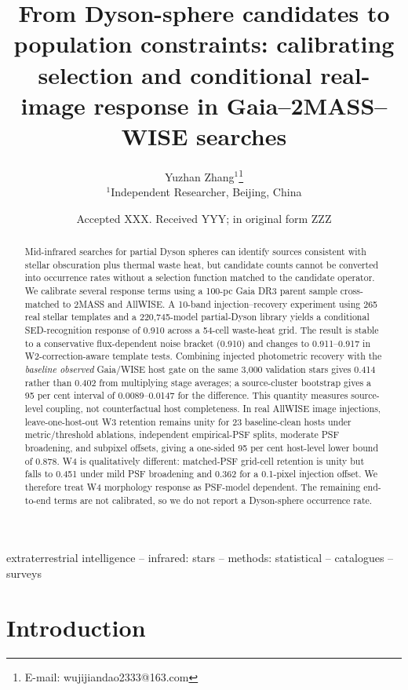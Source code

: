 \documentclass[fleqn,usenatbib]{mnras}
\title[Calibrating Dyson-sphere selection]{From Dyson-sphere candidates to population constraints: calibrating selection and conditional real-image response in Gaia--2MASS--WISE searches}
\author[Zhang]{
Yuzhan Zhang$^{1}$\orcidlink{0009-0000-3121-7972}\thanks{E-mail: wujijiandao2333@163.com}
\\
$^{1}$Independent Researcher, Beijing, China
}
\date{Accepted XXX. Received YYY; in original form ZZZ}
\begin{document}
\label{firstpage}
\pagerange{\pageref{firstpage}--\pageref{lastpage}}
\maketitle

\begin{abstract}
Mid-infrared searches for partial Dyson spheres can identify sources consistent with stellar obscuration plus thermal waste heat, but candidate counts cannot be converted into occurrence rates without a selection function matched to the candidate operator. We calibrate several response terms using a 100-pc Gaia DR3 parent sample cross-matched to 2MASS and AllWISE. A 10-band injection--recovery experiment using 265 real stellar templates and a 220,745-model partial-Dyson library yields a conditional SED-recognition response of 0.910 across a 54-cell waste-heat grid. The result is stable to a conservative flux-dependent noise bracket (0.910) and changes to 0.911--0.917 in W2-correction-aware template tests. Combining injected photometric recovery with the \emph{baseline observed} Gaia/WISE host gate on the same 3,000 validation stars gives 0.414 rather than 0.402 from multiplying stage averages; a source-cluster bootstrap gives a 95 per cent interval of 0.0089--0.0147 for the difference. This quantity measures source-level coupling, not counterfactual host completeness. In real AllWISE image injections, leave-one-host-out W3 retention remains unity for 23 baseline-clean hosts under metric/threshold ablations, independent empirical-PSF splits, moderate PSF broadening, and subpixel offsets, giving a one-sided 95 per cent host-level lower bound of 0.878. W4 is qualitatively different: matched-PSF grid-cell retention is unity but falls to 0.451 under mild PSF broadening and 0.362 for a 0.1-pixel injection offset. We therefore treat W4 morphology response as PSF-model dependent. The remaining end-to-end terms are not calibrated, so we do not report a Dyson-sphere occurrence rate.
\end{abstract}

\begin{keywords}
extraterrestrial intelligence -- infrared: stars -- methods: statistical -- catalogues -- surveys
\end{keywords}

\section{Introduction}
\end{document}
